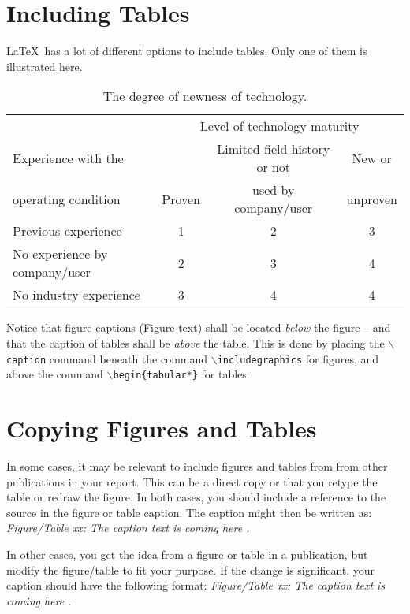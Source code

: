 \section{Including Tables}
\LaTeX\ has a lot of different options to include tables. Only one of them is illustrated here.

\begin{table}
	\centering\small
	\caption{The degree of newness of technology.}
	\label{tab90}
		\begin{tabular*}{\textwidth}{@{\extracolsep{\fill}}lccc}
			\toprule
			  &\multicolumn{3}{c}{Level of technology maturity}\\
  \cmidrule{2-4}
			Experience with the		   &  & Limited field history or not & New or \\
              operating  condition  & Proven &  used by company/user & unproven \\
        
			\midrule
			  Previous experience & 1 & 2 & 3 \\
		          No experience by company/user & 2 & 3 & 4 \\
		          No industry experience & 3 & 4 & 4 \\
			\bottomrule
		\end{tabular*}
\end{table}

\begin{remark}
Notice that figure captions (Figure text) shall be located \emph{below} the figure -- and that the caption of tables shall be \emph{above} the table. This is done by placing the $\backslash$\texttt{caption} command beneath the command $\backslash$\texttt{includegraphics} for figures, and above the command $\backslash$\texttt{begin\{tabular*\}} for tables.
\end{remark}
\section{Copying Figures and Tables}
In some cases, it may be relevant to include figures and tables from from other publications in your report. This can be a direct copy or that you retype the table or redraw the figure. In both cases, you should include a reference to the source in the figure or table caption. The caption might then be written as: \textsl{Figure/Table xx: The caption text is coming here \citep{rausand04}.}

In other cases, you get the idea from a figure or table in a publication, but modify the figure/table to fit your purpose. If the change is significant, your caption should have the following format: \textsl{Figure/Table xx: The caption text is coming here \citep[adapted from][]{rausand04}.}

